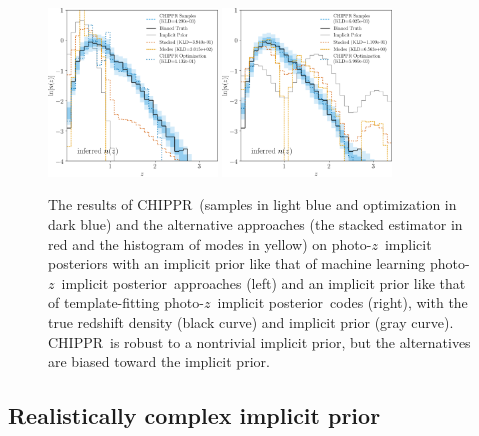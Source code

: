 \documentclass[iop]{emulateapj}
\newcommand{\project}[1]{\textsc{#1}}
\newcommand{\Chippr}{\project{CHIPPR}}
\newcommand{\pz}{photo-$z$}
\newcommand{\pzip}{\pz\ implicit posterior}
\begin{document}
\begin{figure}
	\begin{center}
		\includegraphics[width=0.4\textwidth]{results_prior_training.png}
		\includegraphics[width=0.4\textwidth]{results_prior_template.png}
		\caption
		{The results of \Chippr\ (samples in light blue and optimization in dark blue) and the alternative approaches (the stacked estimator in red and the histogram of modes in yellow) on \pzip s with an implicit prior like that of machine learning \pzip\ approaches (left) and an implicit prior like that of template-fitting \pzip\ codes (right), with the true redshift density (black curve) and implicit prior (gray curve).
			\Chippr\ is robust to a nontrivial implicit prior, but the alternatives are biased toward the implicit prior.
		}
		\label{fig:results-priors}
	\end{center}
\end{figure}

\subsection{Realistically complex implicit prior}
\label{sec:interim}
\end{document}
